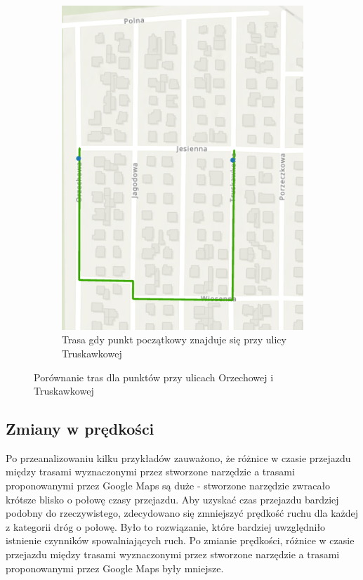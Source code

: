 \documentclass{article}
\begin{document}
\begin{figure}[H]
\begin{subfigure}[b]{0.35\textwidth}
        \includegraphics[width=\textwidth]{img/kierunek-truskawkowa-orzechowa.png}
        \caption{Trasa gdy punkt początkowy znajduje się przy ulicy Truskawkowej}
    \end{subfigure}
    \caption{Porównanie tras dla punktów przy ulicach Orzechowej i Truskawkowej}
\end{figure}

\subsection{Zmiany w prędkości}
Po przeanalizowaniu kilku przykładów zauważono, że różnice w czasie przejazdu między trasami wyznaczonymi przez stworzone narzędzie a trasami proponowanymi przez Google Maps są duże - stworzone narzędzie zwracało krótsze blisko o połowę czasy przejazdu. Aby uzyskać czas przejazdu bardziej podobny do rzeczywistego, zdecydowano się zmniejszyć prędkość ruchu dla każdej z kategorii dróg o połowę. Było to rozwiązanie, które bardziej uwzględniło istnienie czynników spowalniających ruch. Po zmianie prędkości, różnice w czasie przejazdu między trasami wyznaczonymi przez stworzone narzędzie a trasami proponowanymi przez Google Maps były mniejsze.
\end{document}
